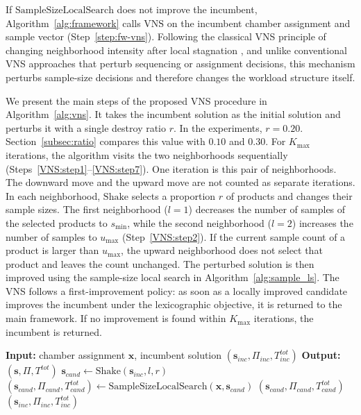 \documentclass[11pt]{article}
\begin{document}
If \(\mathrm{SampleSizeLocalSearch}\) does not improve the incumbent,
Algorithm~\ref{alg:framework} calls \(\mathrm{VNS}\) on the incumbent
chamber assignment and sample vector (Step~\ref{step:fw-vns}).
Following the classical VNS principle of changing neighborhood
intensity after local stagnation \citep{LiaoCheng2007}, and unlike
conventional VNS approaches that perturb sequencing or assignment
decisions, this mechanism perturbs sample-size decisions and therefore
changes the workload structure itself.

We present the main steps of the proposed VNS procedure in
Algorithm~\ref{alg:vns}.
It takes the incumbent solution as the initial solution and perturbs it
with a single destroy ratio \(r\).
In the experiments, \(r=0.20\).
Section~\ref{subsec:ratio} compares this value with \(0.10\) and \(0.30\).
For \(K_{\max}\) iterations, the algorithm visits the two neighborhoods
sequentially (Steps~\ref{VNS:step1}--\ref{VNS:step7}).
One iteration is this pair of neighborhoods.
The downward move and the upward move are not counted as separate
iterations.
In each neighborhood, \(\mathrm{Shake}\) selects a proportion \(r\) of
products and changes their sample sizes.
The first neighborhood (\(l=1\)) decreases the number of samples of
the selected products to \(s_{\min}\), while the second neighborhood
(\(l=2\)) increases the number of samples to \(u_{\max}\)
(Step~\ref{VNS:step2}).
If the current sample count of a product is larger than \(u_{\max}\),
the upward neighborhood does not select that product and leaves the
count unchanged.
The perturbed solution is then improved using the sample-size local
search in Algorithm~\ref{alg:sample_ls}.
The VNS follows a first-improvement policy: as soon as a locally
improved candidate improves the incumbent under the lexicographic
objective, it is returned to the main framework.
If no improvement is found within \(K_{\max}\) iterations, the
incumbent is returned.

\begin{algorithm}[H]
\caption{VNS}
\label{alg:vns}
\label{alg:vns_fixed_destroy}
\label{alg:vns_short}
\begin{algorithmic}[1]
\State \textbf{Input:} chamber assignment \(\mathbf{x}\), incumbent solution \((\mathbf{s}_{inc},\Pi_{inc},T^{tot}_{inc})\)
\State \textbf{Output:} \((\mathbf{s},\Pi,T^{tot})\)
     \label{VNS:step1}
        \State \(\mathbf{s}_{cand}\leftarrow\mathrm{Shake}(\mathbf{s}_{inc},l,r)\) \label{VNS:step2}
        \State \((\mathbf{s}_{cand},\Pi_{cand},T^{tot}_{cand})\leftarrow\mathrm{SampleSizeLocalSearch}(\mathbf{x},\mathbf{s}_{cand})\)
            \State \Return \((\mathbf{s}_{cand},\Pi_{cand},T^{tot}_{cand})\)
        \EndIf
    \EndFor \label{VNS:step7}
\EndFor
\State \Return \((\mathbf{s}_{inc},\Pi_{inc},T^{tot}_{inc})\)
\end{algorithmic}
\end{algorithm}
\end{document}
